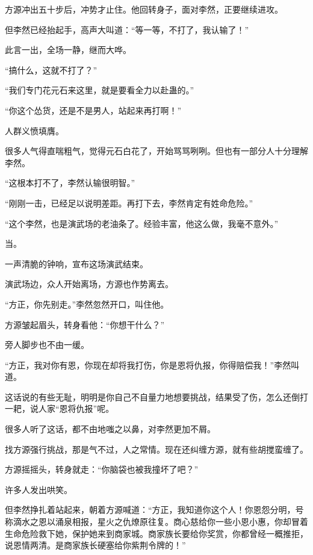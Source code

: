 
\begin{this_body}



方源冲出五十步后，冲势才止住。他回转身子，面对李然，正要继续进攻。

但李然已经抬起手，高声大叫道：“等一等，不打了，我认输了！”

此言一出，全场一静，继而大哗。

“搞什么，这就不打了？”

“我们专门花元石来这里，就是要看全力以赴蛊的。”

“你这个怂货，还是不是男人，站起来再打啊！”

人群义愤填膺。

很多人气得直喘粗气，觉得元石白花了，开始骂骂咧咧。但也有一部分人十分理解李然。

“这根本打不了，李然认输很明智。”

“刚刚一击，已经足以说明差距。再打下去，李然肯定有姓命危险。”

“这个李然，也是演武场的老油条了。经验丰富，他这么做，我毫不意外。”

当。

一声清脆的钟响，宣布这场演武结束。

演武场边，众人开始离场，方源也作势离去。

“方正，你先别走。”李然忽然开口，叫住他。

方源皱起眉头，转身看他：“你想干什么？”

旁人脚步也不由一缓。

“方正，我对你有恩，你现在却将我打伤，你是恩将仇报，你得赔偿我！”李然叫道。

这话说的有些无耻，明明是你自己不自量力地想要挑战，结果受了伤，怎么还倒打一耙，说人家“恩将仇报”呢。

很多人听了这话，都不由地嗤之以鼻，对李然更加不屑。

找方源强行挑战，那是气不过，人之常情。现在还纠缠方源，就有些胡搅蛮缠了。

方源摇摇头，转身就走：“你脑袋也被我撞坏了吧？”

许多人发出哄笑。

但李然挣扎着站起来，朝着方源喊道：“方正，我知道你这个人！你恩怨分明，号称滴水之恩以涌泉相报，星火之仇燎原往复。商心慈给你一些小恩小惠，你却冒着生命危险救下她，保护她来到商家城。商家族长要给你奖赏，你都曾经一概推拒，说恩情两清。是商家族长硬塞给你紫荆令牌的！”


\end{this_body}

